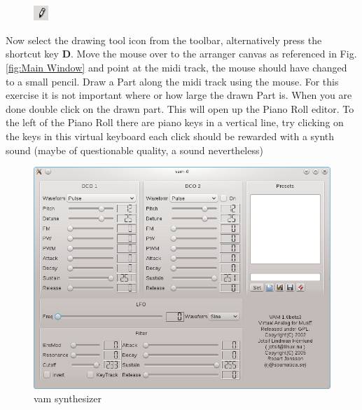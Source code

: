\documentclass[a4paper]{report}
\newcommand{\key}[1]{\textbf{#1}}
\begin{document}
\begin{figure}
\includegraphics[width=0.05\textwidth]{pics/arrow_tool}
\end{figure}
Now select the drawing tool icon
from the toolbar, alternatively press the shortcut key \key{D}.
Move the mouse over to the arranger canvas as referenced in 
Fig. \ref{fig:Main Window}
and point at the midi track, the mouse should have changed to a small pencil.
Draw a Part along the midi track using the mouse. For this exercise it is
not important where or how large the drawn Part is. When you are done double
click on the drawn part. This will open up the Piano Roll editor. To the
left of the Piano Roll there are piano keys in a vertical line, try clicking
on the keys in this virtual keyboard each click should be rewarded with a
synth sound (maybe of questionable quality, a sound nevertheless) 
\begin{figure}[htp]
\centering \includegraphics[width=.5\textwidth]{pics/vam_synth}
\caption{vam synthesizer}
\label{fig:vam_synth}
\end{figure}
\end{document}
